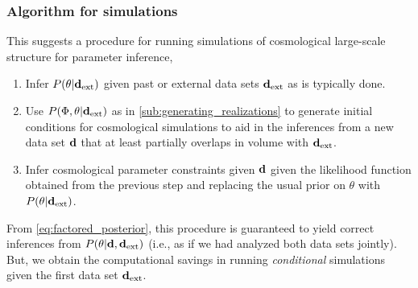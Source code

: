 \documentclass[prd, onecolumn, nofootinbib, floatfix]{revtex4-1}
\begin{document}
\subsubsection{Algorithm for simulations}
This suggests a procedure for running simulations of cosmological large-scale structure for 
parameter inference,
\begin{enumerate}
	\item Infer $P(\theta | \mathbf{d}_{\rm ext})$ given past or external data sets $\mathbf{d}_{\rm ext}$ as is typically done.
	\item Use $P(\Phi, \theta | \mathbf{d}_{\rm ext})$ as in \autoref{sub:generating_realizations} to generate 
	initial conditions for cosmological simulations to aid in the inferences from a new 
	data set $\mathbf{d}$ that at least partially overlaps in volume with $\mathbf{d}_{\rm ext}$.
	\item Infer cosmological parameter constraints given $\mathbf{d}$ given the likelihood function 
	obtained from the previous step and replacing the usual prior on $\theta$ with $P(\theta | \mathbf{d}_{\rm ext})$.
\end{enumerate}
From \autoref{eq:factored_posterior}, this procedure is guaranteed to yield correct inferences 
from $P(\theta | \mathbf{d}, \mathbf{d}_{\rm ext})$ (i.e., as if we had analyzed both data sets jointly). 
But, we obtain the computational savings in running \emph{conditional} simulations given 
the first data set $\mathbf{d}_{\rm ext}$.



\end{document}
